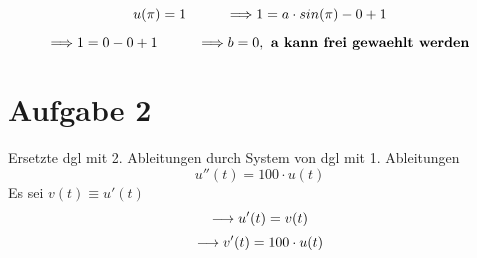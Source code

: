 \documentclass[10pt,oneside,a4paper]{scrartcl}
\begin{document}
    \[
    u(\pi)=1 \hspace*{1cm}  \Longrightarrow 1=a \cdot sin(\pi) -  0 +1 
    \]
    
     \[
     \Longrightarrow 1= 0 -0 +1  \hspace*{1cm} \Longrightarrow b=0 ,\textbf{ a kann frei gewaehlt werden}
    \]
    
\section*{Aufgabe 2}   
Ersetzte dgl mit 2. Ableitungen durch System von dgl mit  1. Ableitungen
\[
u''(t)=100 \cdot u(t)
\]
Es sei $v(t) \equiv u'(t)$ 
\[
\longrightarrow \vspace*{1cm} u'(t)= v(t)
\]
\[
\longrightarrow \vspace*{1cm} v'(t)=100 \cdot u(t)
\]
\end{document}
